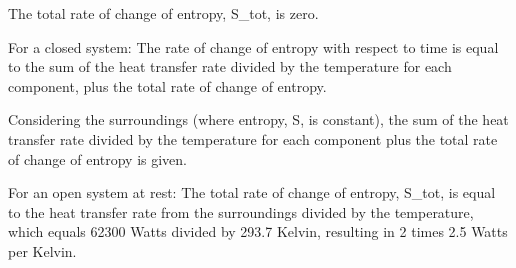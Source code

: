 The total rate of change of entropy, S_tot, is zero.

For a closed system:
The rate of change of entropy with respect to time is equal to the sum of the heat transfer rate divided by the temperature for each component, plus the total rate of change of entropy.

Considering the surroundings (where entropy, S, is constant), the sum of the heat transfer rate divided by the temperature for each component plus the total rate of change of entropy is given.

For an open system at rest:
The total rate of change of entropy, S_tot, is equal to the heat transfer rate from the surroundings divided by the temperature, which equals 62300 Watts divided by 293.7 Kelvin, resulting in 2 times 2.5 Watts per Kelvin.